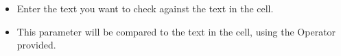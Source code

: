    \begin{itemize}
\item Enter the text you want to check against the text in the cell.
\item This parameter will be compared to the text in the cell, using the Operator provided.
\end{itemize} 